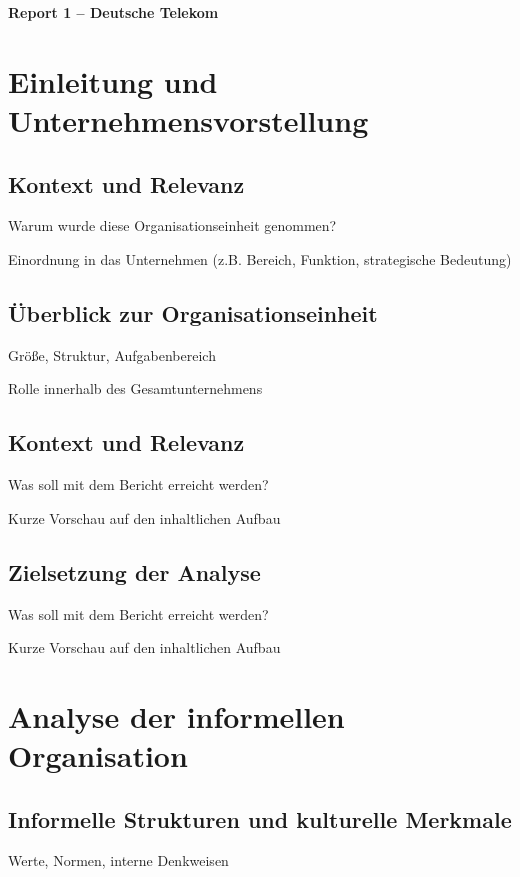 \documentclass[12pt,a4paper]{article}
\begin{document}
	
	\setcounter{page}{1}
	\begin{center}
		\textbf{Report 1 – Deutsche Telekom}
	\end{center}
	
	
	
	\section{Einleitung und Unternehmensvorstellung}
	
	\subsection{Kontext und Relevanz}
	Warum wurde diese Organisationseinheit genommen?
	
	Einordnung in das Unternehmen (z.B. Bereich, Funktion, strategische Bedeutung)
	
	\subsection{ Überblick zur Organisationseinheit}
	Größe, Struktur, Aufgabenbereich
	
	Rolle innerhalb des Gesamtunternehmens
	\subsection{Kontext und Relevanz}
	Was soll mit dem Bericht erreicht werden?
	
	Kurze Vorschau auf den inhaltlichen Aufbau
	
	\subsection{Zielsetzung der Analyse}
	Was soll mit dem Bericht erreicht werden?
	
	Kurze Vorschau auf den inhaltlichen Aufbau
	
	
	\section{Analyse der informellen Organisation}
	\subsection{Informelle Strukturen und kulturelle Merkmale}
	Werte, Normen, interne Denkweisen
	
\end{document}
